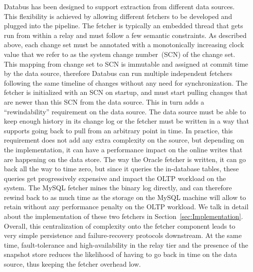 Databus has been designed to support extraction from different data sources. This flexibility is achieved by allowing different fetchers to be developed and plugged into the pipeline. 
The fetcher is typically an embedded thread that gets run from within a relay and must follow a few semantic constraints.
As described above, each change set must be annotated with a monotonically increasing clock value that we refer to as the system change number~(SCN) of the change set.
This mapping from change set to SCN is immutable and assigned at commit time by the data source, therefore Databus can run multiple independent fetchers following the same timeline of changes without any need for synchronization. 
The fetcher is initialized with an SCN on startup, and must start pulling changes that are newer than this SCN from the data source. This in turn adds a ``rewindability'' requirement on the data source. 
The data source must be able to keep enough history in its change log or the fetcher must be written in a way that supports going back to pull from an arbitrary point in time. 
In practice, this requirement does not add any extra complexity on the source, but depending on the implementation, it can have a performance impact on the online writes that are happening on the data store. 
The way the Oracle fetcher is written, it can go back all the way to time zero, but since it queries the in-database tables, these queries get progressively expensive and impact the OLTP workload on the system. 
The MySQL fetcher mines the binary log directly, and can therefore rewind back to as much time as the storage on the MySQL machine will allow to retain without any performance penalty on the OLTP workload. 
We talk in detail about the implementation of these two fetchers in Section~\ref{sec:Implementation}.
Overall, this centralization of complexity onto the fetcher component leads to very simple persistence and failure-recovery protocols downstream. 
At the same time, fault-tolerance and high-availability in the relay tier and the presence of the snapshot store reduces the likelihood of having to go back in time on the data source, thus keeping the fetcher overhead low. 


